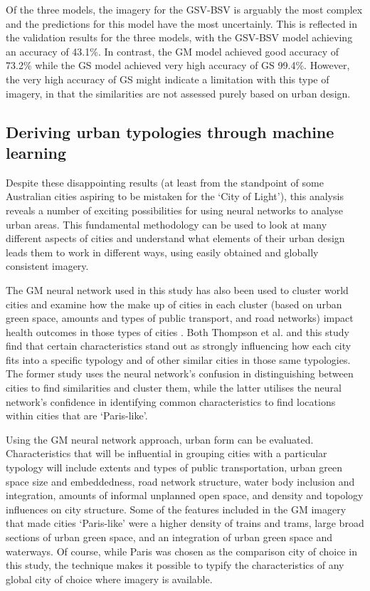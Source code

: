\documentclass[10pt,letterpaper,hidelinks]{article}
\begin{document}
Of the three models, the imagery for the GSV-BSV is arguably the most complex and the predictions for this model have the most uncertainly. This is reflected in the validation results for the three models, with the GSV-BSV model achieving an accuracy of 43.1\%. In contrast, the GM model achieved good accuracy of 73.2\% while the GS model achieved very high accuracy of GS 99.4\%. However, the very high accuracy of GS might indicate a limitation with this type of imagery, in that the similarities are not assessed purely based on urban design.

\subsection*{Deriving urban typologies through machine learning}

Despite these disappointing results (at least from the standpoint of some Australian cities aspiring to be mistaken for the `City of Light'), this analysis reveals a number of exciting possibilities for using neural networks to analyse urban areas. This fundamental methodology can be used to look at many different aspects of cities and understand what elements of their urban design leads them to work in different ways, using easily obtained and globally consistent imagery. 

The GM neural network used in this study has also been used to cluster world cities and examine how the make up of cities in each cluster (based on urban green space, amounts and types of public transport, and road networks) impact health outcomes in those types of cities \cite{Thompson2018}. Both Thompson et al. and this study find that certain characteristics stand out as strongly influencing how each city fits into a specific typology and of other similar cities in those same typologies. The former study uses the neural network's confusion in distinguishing between cities to find similarities and cluster them, while the latter utilises the neural network's confidence in identifying common characteristics to find locations within cities that are `Paris-like'. 
 
Using the GM neural network approach, urban form can be evaluated. Characteristics that will be influential in grouping cities with a particular typology will include extents and types of public transportation, urban green space size and embeddedness, road network structure, water body inclusion and integration, amounts of informal unplanned open space, and density and topology influences on city structure. Some of the features included in the GM imagery that made cities `Paris-like' were a higher density of trains and trams, large broad sections of urban green space, and an integration of urban green space and waterways. Of course, while Paris was chosen as the comparison city of choice in this study, the technique makes it possible to typify the characteristics of any global city of choice where imagery is available.
\end{document}
